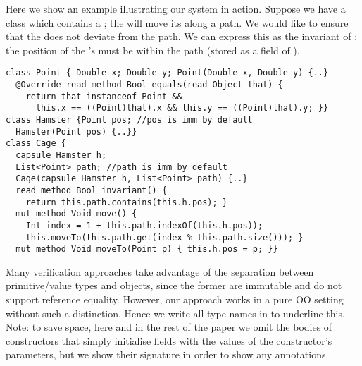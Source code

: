  
Here we show an example illustrating our system in action. Suppose we have a \Q@Cage@ class which contains a \Q@Hamster@; the \Q@Cage@ will move its \Q@Hamster@ along a path. We would like to ensure that the \Q@Hamster@ does not deviate from the path. We can express this as the invariant of \Q@Cage@: the position of the \Q@Cage@'s \Q@Hamster@ must be within the path (stored as a field of \Q@Cage@).

%
\begin{lstlisting}
class Point { Double x; Double y; Point(Double x, Double y) {..}
  @Override read method Bool equals(read Object that) {
    return that instanceof Point &&
      this.x == ((Point)that).x && this.y == ((Point)that).y; }}
class Hamster {Point pos; //pos is imm by default
  Hamster(Point pos) {..}}
class Cage {
  capsule Hamster h;
  List<Point> path; //path is imm by default
  Cage(capsule Hamster h, List<Point> path) {..}
  read method Bool invariant() {
    return this.path.contains(this.h.pos); }
  mut method Void move() {
    Int index = 1 + this.path.indexOf(this.h.pos));
    this.moveTo(this.path.get(index % this.path.size())); }
  mut method Void moveTo(Point p) { this.h.pos = p; }}
\end{lstlisting}

Many verification approaches take advantage of the separation between primitive/value types and objects, since the former are immutable and do not support reference equality.
However, our approach works in a pure OO setting without such a distinction. Hence we write all type names in \Q@BoldTitleCase@ to underline this. Note: to save space, here and in the rest of the paper we omit the bodies of constructors that simply initialise fields with the values of the constructor's parameters, but we show their signature in order to show any annotations.

